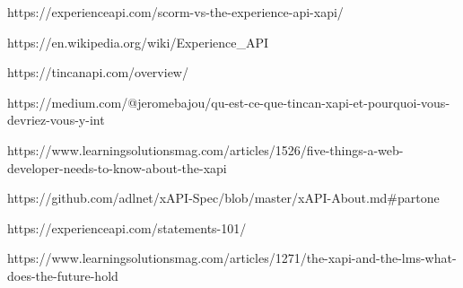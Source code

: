 
https://experienceapi.com/scorm-vs-the-experience-api-xapi/

https://en.wikipedia.org/wiki/Experience_API

https://tincanapi.com/overview/

https://medium.com/@jeromebajou/qu-est-ce-que-tincan-xapi-et-pourquoi-vous-devriez-vous-y-int%

https://www.learningsolutionsmag.com/articles/1526/five-things-a-web-developer-needs-to-know-about-the-xapi

https://github.com/adlnet/xAPI-Spec/blob/master/xAPI-About.md#partone

https://experienceapi.com/statements-101/

https://www.learningsolutionsmag.com/articles/1271/the-xapi-and-the-lms-what-does-the-future-hold


